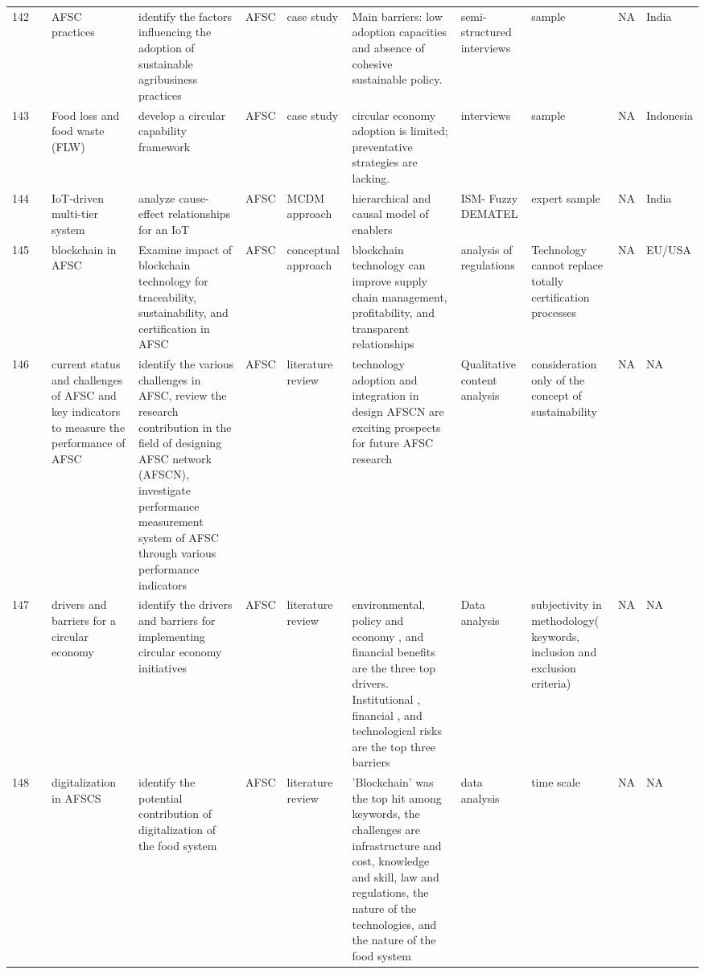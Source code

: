 \documentclass[a4paper,10pt]{article}
\begin{document}
\begin{landscape}
\begin{small}
\begin{longtable}{p{0.5cm} p{2cm} p{2.5cm} p{4cm} p{1cm} p{2.5cm} p{5.5cm} p{2.5cm} p{2.5cm} p{1.8cm} p{1.5cm}}
142 & \textcite{Joshi10} &AFSC practices & identify the factors influencing the adoption of sustainable agribusiness practices&AFSC &case study& Main barriers: low adoption capacities and absence of cohesive sustainable policy. &semi-structured interviews& sample  & NA& India  \\
143 & \textcite{Kusumowardani12} &Food loss and food waste (FLW) & develop a circular capability framework &AFSC &case study& circular economy adoption is limited; preventative strategies are lacking.  &interviews& sample  & NA& Indonesia  \\
144 & \textcite{Yadav10} & IoT-driven multi-tier system  & analyze cause-effect relationships for an IoT&AFSC &MCDM approach& hierarchical and causal model of enablers  &ISM- Fuzzy DEMATEL& expert sample  & NA& India  \\
145 & \textcite{Gianluca1} &blockchain in AFSC & Examine impact of blockchain technology for traceability, sustainability, and certification in AFSC&AFSC &conceptual approach& blockchain technology can improve supply chain management, profitability, and transparent relationships  &analysis of regulations & Technology cannot replace totally certification processes  & NA& EU/USA  \\
146 & \textcite{Yadav145} &current status and challenges of AFSC and key indicators to measure the performance of AFSC & identify the various challenges in AFSC, review the research contribution in the field of designing AFSC network (AFSCN), investigate performance measurement system of AFSC through various performance indicators&AFSC & literature review& technology adoption and integration in design AFSCN are exciting prospects for future AFSC research &Qualitative content analysis   & consideration only of the concept of sustainability& NA& NA  \\
147 & \textcite{Mehmood147} &drivers and barriers for a circular economy & identify the drivers and barriers for implementing circular economy initiatives &AFSC & literature review& environmental, policy and economy , and financial benefits  are the three top drivers. Institutional , financial , and technological risks  are the top three barriers&Data analysis  & subjectivity in methodology( keywords, inclusion and exclusion criteria)& NA&NA  \\
148 & \textcite{Amentae150} &digitalization in AFSCS& identify the potential contribution of digitalization of the food system &AFSC & literature review& 'Blockchain' was the top hit among keywords, the challenges are infrastructure and cost, knowledge and skill, law and regulations, the nature of the technologies, and the nature of the food system &data analysis   &time scale& NA& NA  \\

\end{longtable}
\end{small}
\end{landscape}
\end{document}
